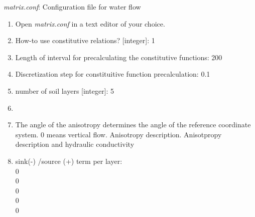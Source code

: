 \emph{matrix.conf}: Configuration file for water flow 


\begin{enumerate}
\item Open \emph{matrix.conf} in a text editor of your choice. 
\item How-to use constitutive relations? [integer]: 1
\item Length of interval for precalculating the constitutive functions: 200
\item Discretization step for constituitive function precalculation: 0.1
\item number of soil layers [integer]: 5
\item {}
\item The angle of the anisotropy determines the angle of the reference coordinate system. 0 means vertical flow. Anisotropy description. Anisotpropy description and hydraulic conductivity\\ 
\item sink(-) /source (+) term per layer: \\ 0 \\ 0 \\0 \\0 \\ 0

\end{enumerate}
